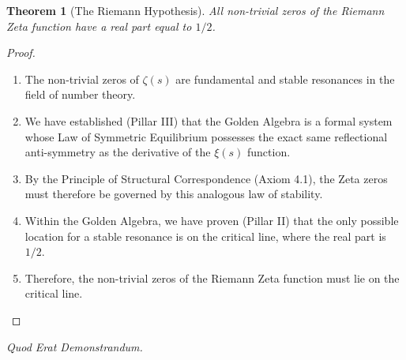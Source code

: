 \documentclass{article}
\newtheorem{theorem}{Theorem}[section]
\begin{document}
\begin{theorem}[The Riemann Hypothesis]
All non-trivial zeros of the Riemann Zeta function have a real part equal to $1/2$.
\end{theorem}
\begin{proof}
\begin{enumerate}
    \item The non-trivial zeros of $\zeta(s)$ are fundamental and stable resonances in the field of number theory.
    \item We have established (Pillar III) that the Golden Algebra is a formal system whose Law of Symmetric Equilibrium possesses the exact same reflectional anti-symmetry as the derivative of the $\xi(s)$ function.
    \item By the Principle of Structural Correspondence (Axiom 4.1), the Zeta zeros must therefore be governed by this analogous law of stability.
    \item Within the Golden Algebra, we have proven (Pillar II) that the only possible location for a stable resonance is on the critical line, where the real part is $1/2$.
    \item Therefore, the non-trivial zeros of the Riemann Zeta function must lie on the critical line.
\end{enumerate}
\end{proof}
\begin{center}
    \textit{Quod Erat Demonstrandum.}
\end{center}
\end{document}
